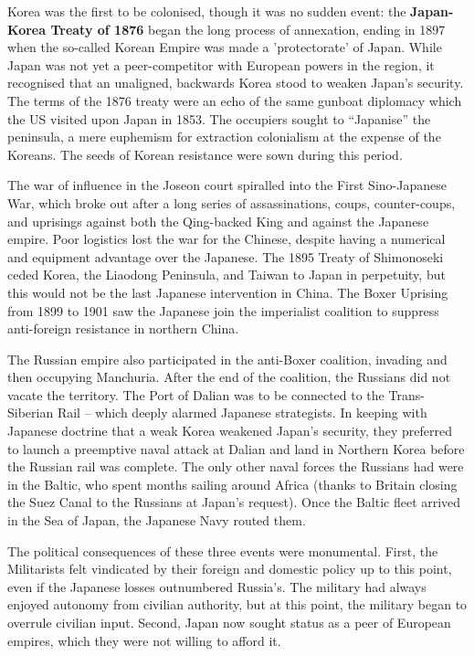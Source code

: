 \documentclass[letterpaper,12pt,twoside]{article} %
\begin{document}
\begin{multicols}{2}
  Korea was the first to be colonised, though it was no sudden event: the \textbf{Japan-Korea Treaty of 1876} began the long process of annexation, ending in 1897 when the so-called Korean Empire was made a 'protectorate' of Japan. While Japan was not yet a peer-competitor with European powers in the region, it recognised that an unaligned, backwards Korea stood to weaken Japan's security. The terms of the 1876 treaty were an echo of the same gunboat diplomacy which the US visited upon Japan in 1853. The occupiers sought to ``Japanise'' the peninsula, a mere euphemism for extraction colonialism at the expense of the Koreans. The seeds of Korean resistance were sown during this period.

  The war of influence in the Joseon court spiralled into the First Sino-Japanese War, which broke out after a long series of assassinations, coups, counter-coups, and uprisings against both the Qing-backed King and against the Japanese empire. Poor logistics lost the war for the Chinese, despite having a numerical and equipment advantage over the Japanese. The 1895 Treaty of Shimonoseki ceded Korea, the Liaodong Peninsula, and Taiwan to Japan in perpetuity, but this would not be the last Japanese intervention in China. The Boxer Uprising from 1899 to 1901 saw the Japanese join the imperialist coalition to suppress anti-foreign resistance in northern China.

  The Russian empire also participated in the anti-Boxer coalition, invading and then occupying Manchuria. After the end of the coalition, the Russians did not vacate the territory. The Port of Dalian was to be connected to the Trans-Siberian Rail -- which deeply alarmed Japanese strategists. In keeping with Japanese doctrine that a weak Korea weakened Japan's security, they preferred to launch a preemptive naval attack at Dalian and land in Northern Korea before the Russian rail was complete. The only other naval forces the Russians had were in the Baltic, who spent months sailing around Africa (thanks to Britain closing the Suez Canal to the Russians at Japan's request). Once the Baltic fleet arrived in the Sea of Japan, the Japanese Navy routed them.

  The political consequences of these three events were monumental. First, the Militarists felt vindicated by their foreign and domestic policy up to this point, even if the Japanese losses outnumbered Russia's. The military had always enjoyed autonomy from civilian authority, but at this point, the military began to overrule civilian input. Second, Japan now sought status as a peer of European empires, which they were not willing to afford it.


\end{multicols}
\end{document}
